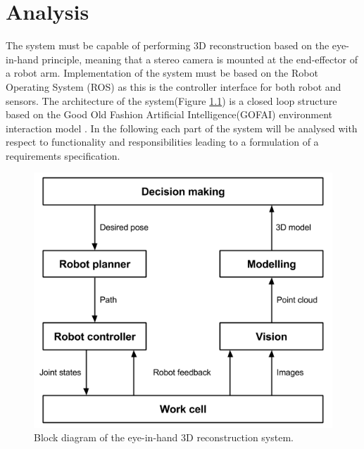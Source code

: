 \chapter{Analysis}
The system must be capable of performing 3D reconstruction based on the eye-in-hand principle, meaning that a stereo camera is mounted at the end-effector of a robot arm. Implementation of the system must be based on the Robot Operating System (ROS) as this is the controller interface for both robot and sensors. The architecture of the system(Figure \ref{fig:block_diagram}) is a closed loop structure based on the Good Old Fashion Artificial Intelligence(GOFAI) environment interaction model \cite{Pfeifer2007a}. In the following each part of the system will be analysed with respect to functionality and responsibilities leading to a formulation of a requirements specification.

\begin{figure}[htb]
	\begin{center}
		\includegraphics[scale=0.5,trim=0 0 0 0]{graphics/02_analysis/block_diagram.png}%
		\caption{Block diagram of the eye-in-hand 3D reconstruction system.}
		\label{fig:block_diagram}
	\end{center}
\end{figure}

